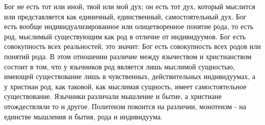 \documentclass[12pt,oneside]{book}
\begin{document}
Бог не есть тот или иной, твой или мой дух; он есть тот дух, который мыслится или представляется как единичный, единственный, самостоятельный дух. Бог есть вообще индивидуализированное или олицетворенное понятие рода, то есть род, мыслимый существующим как род в отличие от индивидуумов. Бог есть совокупность всех реальностей, это значит: Бог есть совокупность всех родов или понятий рода. В этом отношении различие между язычеством и христианством состоит в том, что у язычников род является лишь мыслимой сущностью, имеющей существование лишь в чувственных, действительных индивидуумах, а у христиан род, как таковой, как мыслимая сущность, имеет самостоятельное существование. Язычники различали мышление и бытие, а христиане отождествляли то и другое. Политеизм покоится на различии, монотеизм - на единстве мышления и бытия, рода и индивидуума. 
\end{document}
